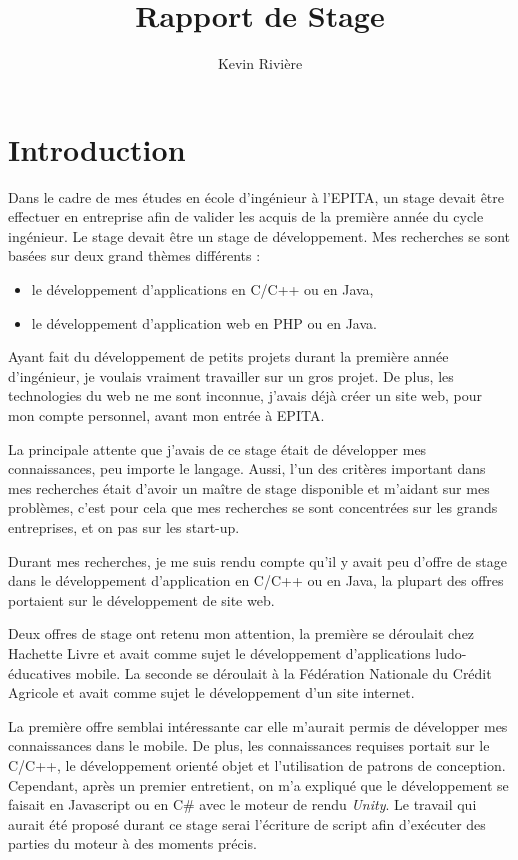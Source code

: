 \documentclass[12pt,a4paper]{article}
\author{Kevin Rivière}
\title{Rapport de Stage}
\begin{document}
\maketitle
\thispagestyle{empty}
\setcounter{page}{0}
\newpage

\tableofcontents
\thispagestyle{empty}
\setcounter{page}{0}
\newpage

\section{Introduction}
Dans le cadre de mes études en école d'ingénieur à l'EPITA, un stage devait être effectuer en entreprise afin de valider les acquis de la première année du cycle ingénieur. Le stage devait être un stage de développement. Mes recherches se sont basées sur deux grand thèmes différents : 
\begin{itemize}
\item le développement d'applications en C/C++ ou en Java,
\item le développement d'application web en PHP ou en Java.
\end{itemize}\par
Ayant fait du développement de petits projets durant la première année d'ingénieur, je voulais vraiment travailler sur un gros projet. De plus, les technologies du web ne me sont inconnue, j'avais déjà créer un site web, pour mon compte personnel, avant mon entrée à EPITA.\par 
\medskip
La principale attente que j'avais de ce stage était de développer mes connaissances, peu importe le langage. Aussi, l'un des critères important dans mes recherches était d'avoir un maître de stage disponible et m'aidant sur mes problèmes, c'est pour cela que mes recherches se sont concentrées sur les grands entreprises, et on pas sur les start-up.\par
Durant mes recherches, je me suis rendu compte qu'il y avait peu d'offre de stage dans le développement d'application en C/C++ ou en Java, la plupart des offres portaient sur le développement de site web. \par 
\medskip
Deux offres de stage ont retenu mon attention, la première se déroulait chez Hachette Livre et avait comme sujet le développement d'applications ludo-éducatives mobile. La seconde se déroulait à la Fédération Nationale du Crédit Agricole et avait comme sujet le développement d'un site internet.\par 
\medskip
La première offre semblai intéressante car elle m'aurait permis de développer mes connaissances dans le mobile. De plus, les connaissances requises portait sur le C/C++, le développement orienté objet et l'utilisation de patrons de conception. Cependant, après un premier entretient, on m'a expliqué que le développement se faisait en Javascript ou en C\# avec le moteur de rendu \textit{Unity}. Le travail qui aurait été proposé durant ce stage serai l'écriture de script afin d'exécuter des parties du moteur à des moments précis.\par 
\end{document}
